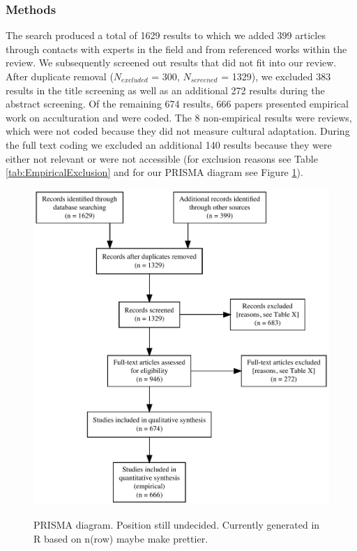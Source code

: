 \subsubsection{Methods}

The search produced a total of 1629 results to which we added 399
articles through contacts with experts in the field and from referenced
works within the review. We subsequently screened out results that did
not fit into our review. After duplicate removal (\(N_{excluded}\) =
300, \(N_{screened}\) = 1329), we excluded 383 results in the title
screening as well as an additional 272 results during the abstract
screening. Of the remaining 674 results, 666 papers presented empirical
work on acculturation and were coded. The 8 non-empirical results were
reviews, which were not coded because they did not measure cultural
adaptation. During the full text coding we excluded an additional 140
results because they were either not relevant or were not accessible
(for exclusion reasons see Table \ref{tab:EmpiricalExclusion} and for
our PRISMA diagram see Figure \ref{fig:PRISMA}).

\begin{figure}[h]
\centering
\caption{PRISMA diagram. Position still undecided. Currently generated in R based on n(row) maybe make prettier.}
\includegraphics[width=\textwidth]{Figures/PRISMA}
\label{fig:PRISMA}
\end{figure}

